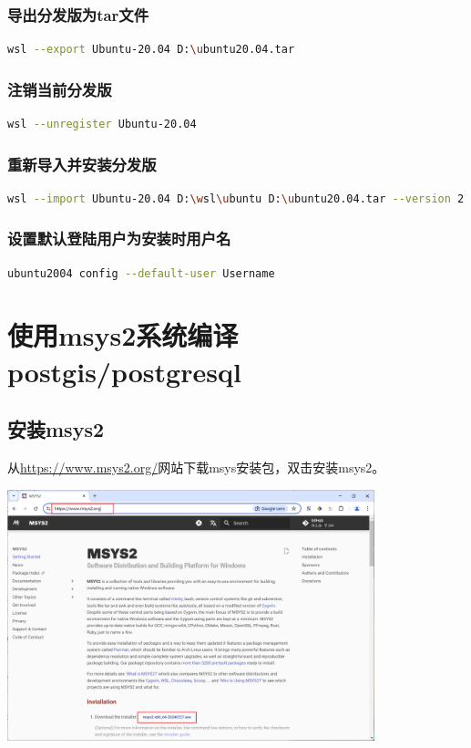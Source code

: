 \subsection{导出分发版为tar文件}
\begin{lstlisting}[language=bash]
wsl --export Ubuntu-20.04 D:\ubuntu20.04.tar
\end{lstlisting}


\subsection{注销当前分发版}
\begin{lstlisting}[language=bash]
wsl --unregister Ubuntu-20.04
\end{lstlisting}


\subsection{重新导入并安装分发版}
\begin{lstlisting}[language=bash]
wsl --import Ubuntu-20.04 D:\wsl\ubuntu D:\ubuntu20.04.tar --version 2
\end{lstlisting}


\subsection{设置默认登陆用户为安装时用户名}
\begin{lstlisting}[language=bash]
ubuntu2004 config --default-user Username
\end{lstlisting}


\chapter{使用msys2系统编译postgis/postgresql}

\section{安装msys2}
从\href{https://www.msys2.org/}{https://www.msys2.org/}网站下载msys安装包，双击安装msys2。

\begin{center}
	\includegraphics[width=0.8\textwidth]{03install/msys2_download.png}
\end{center}



